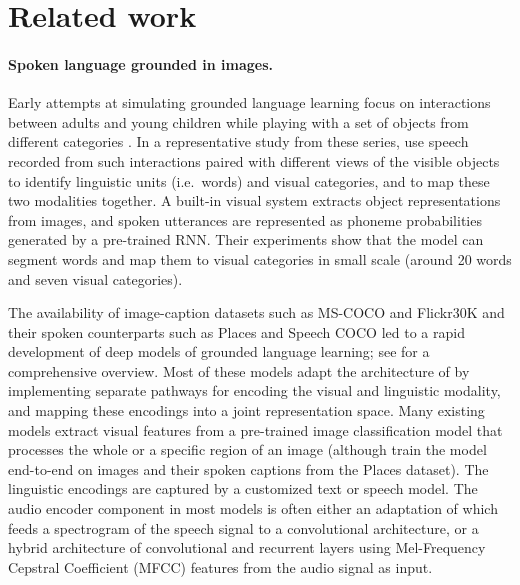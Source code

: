 \section{Related work}
\label{sec:related}

\paragraph{Spoken language grounded in images.}
Early attempts at simulating grounded language learning focus on interactions between adults and young children while playing with a set of objects from different categories \cite{roy1999learning, roy2000grounded, roy2000learning, roy2002learning, gorniak2003visually, mukherjee2003visual}. In a representative study from these series, \citet{roy2002learning} use speech recorded from such interactions paired with different views of the visible objects to identify linguistic units (i.e.\ words) and visual categories, and to map these two modalities together. A built-in visual system extracts object representations from images, and spoken utterances are represented as phoneme probabilities generated by a pre-trained RNN. Their experiments show that the model can segment words and map them to visual categories in small scale (around 20 words and seven visual categories).

The availability of image-caption datasets such as MS-COCO \cite{lin2014microsoft} and Flickr30K \cite{plummer2015flickr30k} and their spoken counterparts such as Places \cite{zhou2014learning} and Speech COCO \cite{speech_coco} led to a rapid development of deep models of grounded language learning; see \citet{chrupala-visually-2021} for a comprehensive overview. Most of these models adapt the architecture of \citet{karpathy2014deep} by implementing separate pathways for encoding the visual and linguistic modality, and mapping these encodings into a joint representation space. Many existing models extract visual features from a pre-trained image classification model that processes the whole or a specific region of an image (although \citet{harwath2018jointly} train the model end-to-end on images and their spoken captions from the Places dataset). The linguistic encodings are captured by a customized text or speech model.  The audio encoder component in most models is often either an adaptation of \citet{harwath2016unsupervised} which feeds a spectrogram of the speech signal to a convolutional architecture, or a hybrid architecture of convolutional and recurrent layers using  Mel-Frequency Cepstral Coefficient (MFCC) features from the audio signal as input.

